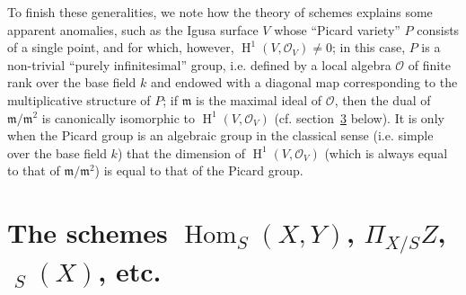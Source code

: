 \documentclass{article}
\newcommand{\scr}[1]{{\mathscr{#1}}}
\newcommand{\fk}[1]{{\mathfrak{#1}}}
\DeclareMathOperator{\Hom}{Hom}
\DeclareMathOperator{\Aut}{Aut}
\DeclareMathOperator{\shAut}{\underline{\Aut}}
\DeclareMathOperator{\HH}{H}
\begin{document}
To finish these generalities, we note how the theory of schemes explains some apparent anomalies, such as the Igusa surface $V$ whose ``Picard variety'' $P$ consists of a single point, and for which, however, $\HH^1(V,\scr{O}_V)\neq0$;
in this case, $P$ is a non-trivial ``purely infinitesimal'' group, i.e. defined by a local algebra $\scr{O}$ of finite rank over the base field $k$ and endowed with a diagonal map corresponding to the multiplicative structure of $P$;
if $\fk{m}$ is the maximal ideal of $\scr{O}$, then the dual of $\fk{m}/\fk{m}^2$ is canonically isomorphic to $\HH^1(V,\scr{O}_V)$ (cf. section~\hyperref[C.3]{3} below).
It is only when the Picard group is an algebraic group in the classical sense (i.e. simple over the base field $k$) that the dimension of $\HH^1(V,\scr{O}_V)$ (which is always equal to that of $\fk{m}/\fk{m}^2$) is equal to that of the Picard group.


\section{The schemes \texorpdfstring{$\Hom_S(X,Y)$}{HomS(X,Y)}, \texorpdfstring{$\Pi_{X/S}Z$}{Pi X/S Z}, \texorpdfstring{$\shAut_S(X)$}{AutS(X)}, etc.}
\label{C.2}
\end{document}
